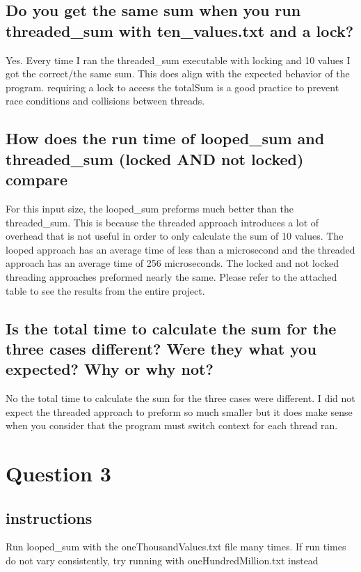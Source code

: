 \documentclass{assignment-x}
\begin{document}
\subsection{Do you get the same sum when you run threaded\_sum with ten\_values.txt and a lock?}
Yes. Every time I ran the threaded\_sum executable with locking and 10 values I got the correct/the same sum. This does align with the expected behavior of the program. requiring a lock to access the totalSum is a good practice to prevent race conditions and collisions between threads.

\subsection{How does the run time of looped\_sum and threaded\_sum (locked AND not locked) compare}
For this input size, the looped\_sum preforms much better than the threaded\_sum. This is because the threaded approach introduces a lot of overhead that is not useful in order to only calculate the sum of 10 values. The looped approach has an average time of less than a microsecond and the threaded approach has an average time of 256 microseconds. The locked and not locked threading approaches preformed nearly the same.
Please refer to the attached table to see the results from the entire project.

\subsection{Is the total time to calculate the sum for the three cases different? Were they what you expected? Why or why not?}
No the total time to calculate the sum for the three cases were different. I did not expect the threaded approach to preform so much smaller but it does make sense when you consider that the program must switch context for each thread ran.

\section{Question 3}
\subsection{instructions}
Run looped\_sum with the oneThousandValues.txt file many times. If run times do not vary consistently, try running with oneHundredMillion.txt instead
\end{document}
